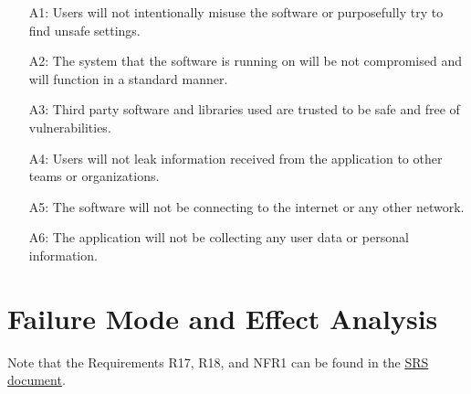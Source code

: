 \documentclass{article}
\begin{document}
\begin{itemize}
    \item [A1:] Users will not intentionally misuse the software or purposefully try to find unsafe settings.
    \item [A2:] The system that the software is running on will be not compromised and will function in a standard manner.
    \item [A3:] Third party software and libraries used are trusted to be safe and free of vulnerabilities.
    \item [A4:] Users will not leak information received from the application to other teams or organizations. 
    \item [A5:] The software will not be connecting to the internet or any other network.
    \item [A6:] The application will not be collecting any user data or personal information.
\end{itemize}


\section{Failure Mode and Effect Analysis}
Note that the Requirements R17, R18, and NFR1 can be found in the \href{https://github.com/gr812b/CVT-Simulator/blob/main/docs/SRS/SRS.pdf#page=40}{SRS document}.
\end{document}
